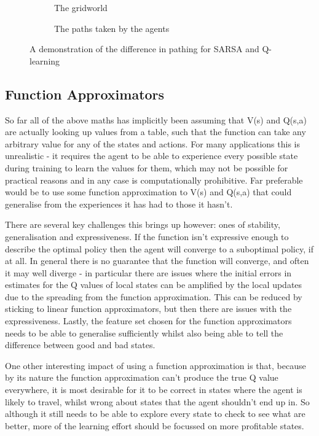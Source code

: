 \begin{figure}
\begin{subfigure}{0.5\textwidth}

\caption{The gridworld}
\label{fig:gridworld}
\end{subfigure}
\begin{subfigure}{0.5\textwidth}

\caption{The paths taken by the agents}
\label{fig:gridworldpaths}
\end{subfigure}
\caption{A demonstration of the difference in pathing for SARSA and Q-learning}
\end{figure}

\subsection{Function Approximators}
So far all of the above maths has implicitly been assuming that V(s) and Q(s,a) are actually looking up values from a table, such that the function can take any arbitrary value for any of the states and actions. For many applications this is unrealistic - it requires the agent to be able to experience every possible state during training to learn the values for them, which may not be possible for practical reasons and in any case is computationally prohibitive. Far preferable would be to use some function approximation to V(s) and Q(s,a) that could generalise from the experiences it has had to those it hasn't.

There are several key challenges this brings up however: ones of stability, generalisation and expressiveness. If the function isn't expressive enough to describe the optimal policy then the agent will converge to a suboptimal policy, if at all. In general there is no guarantee that the function will converge, and often it may well diverge - in particular there are issues where the initial errors in estimates for the Q values of local states can be amplified by the local updates due to the spreading from the function approximation. This can be reduced by sticking to linear function approximators, but then there are issues with the expressiveness. Lastly, the feature set chosen for the function approximators needs to be able to generalise sufficiently whilst also being able to tell the difference between good and bad states.

One other interesting impact of using a function approximation is that, because by its nature the function approximation can't produce the true Q value everywhere, it is most desirable for it to be correct in states where the agent is likely to travel, whilst wrong about states that the agent shouldn't end up in. So although it still needs to be able to explore every state to check to see what are better, more of the learning effort should be focussed on more profitable states.

